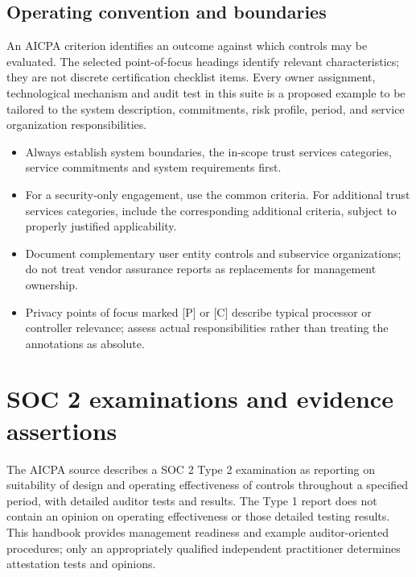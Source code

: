 \documentclass[10pt,oneside]{report}
\begin{document}
\section*{Operating convention and boundaries}
An AICPA criterion identifies an outcome against which controls may be evaluated. The selected point-of-focus headings identify relevant characteristics; they are not discrete certification checklist items. Every owner assignment, technological mechanism and audit test in this suite is a proposed example to be tailored to the system description, commitments, risk profile, period, and service organization responsibilities.

\begin{itemize}
\item Always establish system boundaries, the in-scope trust services categories, service commitments and system requirements first.
\item For a security-only engagement, use the common criteria. For additional trust services categories, include the corresponding additional criteria, subject to properly justified applicability.
\item Document complementary user entity controls and subservice organizations; do not treat vendor assurance reports as replacements for management ownership.
\item Privacy points of focus marked [P] or [C] describe typical processor or controller relevance; assess actual responsibilities rather than treating the annotations as absolute.
\end{itemize}

\chapter{SOC 2 examinations and evidence assertions}
The AICPA source describes a SOC 2 Type 2 examination as reporting on suitability of design and operating effectiveness of controls throughout a specified period, with detailed auditor tests and results. The Type 1 report does not contain an opinion on operating effectiveness or those detailed testing results. This handbook provides management readiness and example auditor-oriented procedures; only an appropriately qualified independent practitioner determines attestation tests and opinions.
\end{document}
